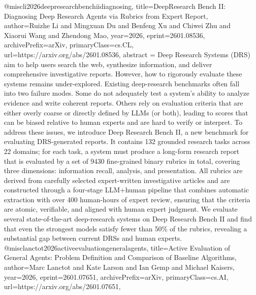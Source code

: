 {}@misc{li2026deepresearchbenchiidiagnosing,
      title={DeepResearch Bench II: Diagnosing Deep Research Agents via Rubrics from Expert Report}, 
      author={Ruizhe Li and Mingxuan Du and Benfeng Xu and Chiwei Zhu and Xiaorui Wang and Zhendong Mao},
      year={2026},
      eprint={2601.08536},
      archivePrefix={arXiv},
      primaryClass={cs.CL},
      url={https://arxiv.org/abs/2601.08536},
      abstract = {Deep Research Systems (DRS) aim to help users search the web, synthesize information, and deliver comprehensive investigative reports. However, how to rigorously evaluate these systems remains under-explored. Existing deep-research benchmarks often fall into two failure modes. Some do not adequately test a system's ability to analyze evidence and write coherent reports. Others rely on evaluation criteria that are either overly coarse or directly defined by LLMs (or both), leading to scores that can be biased relative to human experts and are hard to verify or interpret. To address these issues, we introduce Deep Research Bench II, a new benchmark for evaluating DRS-generated reports. It contains 132 grounded research tasks across 22 domains; for each task, a system must produce a long-form research report that is evaluated by a set of 9430 fine-grained binary rubrics in total, covering three dimensions: information recall, analysis, and presentation. All rubrics are derived from carefully selected expert-written investigative articles and are constructed through a four-stage LLM+human pipeline that combines automatic extraction with over 400 human-hours of expert review, ensuring that the criteria are atomic, verifiable, and aligned with human expert judgment. We evaluate several state-of-the-art deep-research systems on Deep Research Bench II and find that even the strongest models satisfy fewer than 50\% of the rubrics, revealing a substantial gap between current DRSs and human experts.}
}@misc{lanctot2026activeevaluationgeneralagents,
      title={Active Evaluation of General Agents: Problem Definition and Comparison of Baseline Algorithms}, 
      author={Marc Lanctot and Kate Larson and Ian Gemp and Michael Kaisers},
      year={2026},
      eprint={2601.07651},
      archivePrefix={arXiv},
      primaryClass={cs.AI},
      url={https://arxiv.org/abs/2601.07651},
}
